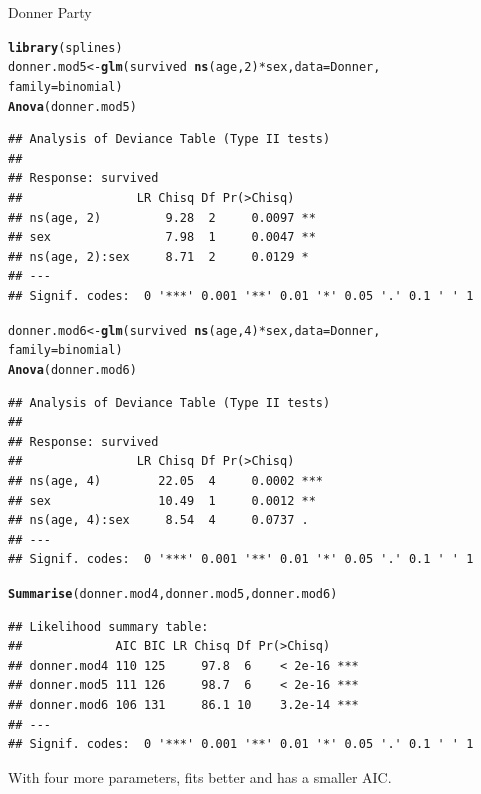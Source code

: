 \documentclass[11pt]{book}\usepackage[]{graphicx}\usepackage[]{color}
\makeatletter
\newcommand{\hlnum}[1]{\textcolor[rgb]{0.686,0.059,0.569}{#1}}%
\newcommand{\hlopt}[1]{\textcolor[rgb]{0,0,0}{#1}}%
\newcommand{\hlstd}[1]{\textcolor[rgb]{0.345,0.345,0.345}{#1}}%
\newcommand{\hlkwb}[1]{\textcolor[rgb]{0.69,0.353,0.396}{#1}}%
\newcommand{\hlkwc}[1]{\textcolor[rgb]{0.333,0.667,0.333}{#1}}%
\newcommand{\hlkwd}[1]{\textcolor[rgb]{0.737,0.353,0.396}{\textbf{#1}}}%
\newenvironment{kframe}{%
 \def\at@end@of@kframe{}%
 \ifinner\ifhmode%
  \def\at@end@of@kframe{\end{minipage}}%
  \begin{minipage}{\columnwidth}%
 \fi\fi%
 \def\FrameCommand##1{\hskip\@totalleftmargin \hskip-\fboxsep
 \colorbox{shadecolor}{##1}\hskip-\fboxsep
     \hskip-\linewidth \hskip-\@totalleftmargin \hskip\columnwidth}%
 \MakeFramed {\advance\hsize-\width
   \@totalleftmargin\z@ \linewidth\hsize
   \@setminipage}}%
 {\par\unskip\endMakeFramed%
 \at@end@of@kframe}
\newenvironment{knitrout}{}{} %
\renewenvironment{knitrout}{\small\renewcommand{\baselinestretch}{.85}}{} %
\makeatother
\begin{document}
\begin{Example}[donner1]{Donner Party}
\begin{knitrout}
\color{fgcolor}\begin{kframe}
\begin{alltt}
\hlkwd{library}\hlstd{(splines)}
\hlstd{donner.mod5} \hlkwb{<-} \hlkwd{glm}\hlstd{(survived} \hlopt{~} \hlkwd{ns}\hlstd{(age,}\hlnum{2}\hlstd{)} \hlopt{*} \hlstd{sex,} \hlkwc{data}\hlstd{=Donner,}
                   \hlkwc{family}\hlstd{=binomial)}
\hlkwd{Anova}\hlstd{(donner.mod5)}
\end{alltt}
\begin{verbatim}
## Analysis of Deviance Table (Type II tests)
## 
## Response: survived
##                LR Chisq Df Pr(>Chisq)   
## ns(age, 2)         9.28  2     0.0097 **
## sex                7.98  1     0.0047 **
## ns(age, 2):sex     8.71  2     0.0129 * 
## ---
## Signif. codes:  0 '***' 0.001 '**' 0.01 '*' 0.05 '.' 0.1 ' ' 1
\end{verbatim}
\begin{alltt}
\hlstd{donner.mod6} \hlkwb{<-} \hlkwd{glm}\hlstd{(survived} \hlopt{~} \hlkwd{ns}\hlstd{(age,}\hlnum{4}\hlstd{)} \hlopt{*} \hlstd{sex,} \hlkwc{data}\hlstd{=Donner,}
                   \hlkwc{family}\hlstd{=binomial)}
\hlkwd{Anova}\hlstd{(donner.mod6)}
\end{alltt}
\begin{verbatim}
## Analysis of Deviance Table (Type II tests)
## 
## Response: survived
##                LR Chisq Df Pr(>Chisq)    
## ns(age, 4)        22.05  4     0.0002 ***
## sex               10.49  1     0.0012 ** 
## ns(age, 4):sex     8.54  4     0.0737 .  
## ---
## Signif. codes:  0 '***' 0.001 '**' 0.01 '*' 0.05 '.' 0.1 ' ' 1
\end{verbatim}
\begin{alltt}
\hlkwd{Summarise}\hlstd{(donner.mod4, donner.mod5, donner.mod6)}
\end{alltt}
\begin{verbatim}
## Likelihood summary table:
##             AIC BIC LR Chisq Df Pr(>Chisq)    
## donner.mod4 110 125     97.8  6    < 2e-16 ***
## donner.mod5 111 126     98.7  6    < 2e-16 ***
## donner.mod6 106 131     86.1 10    3.2e-14 ***
## ---
## Signif. codes:  0 '***' 0.001 '**' 0.01 '*' 0.05 '.' 0.1 ' ' 1
\end{verbatim}
\end{kframe}
\end{knitrout}
With four more parameters,  fits better and has
a smaller AIC.


\end{Example}
\end{document}
